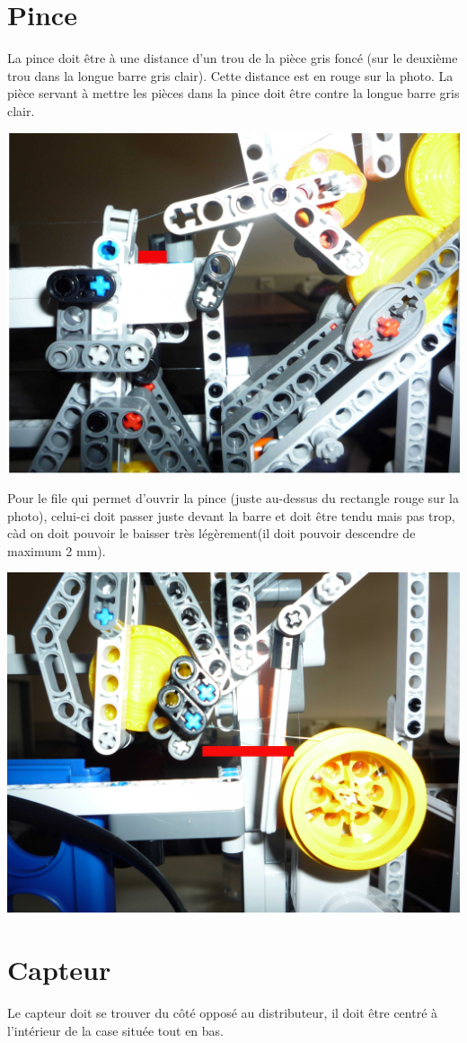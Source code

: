 \documentclass[12pt]{report}
\begin{document}
\section{Pince}
La pince doit être à une distance d'un trou de la pièce gris foncé 
(sur le deuxième trou dans la longue barre gris clair). Cette 
distance est en rouge sur la photo. La pièce servant à mettre les 
pièces dans la pince doit être contre la longue barre gris clair.
\begin{center}
		\includegraphics[width=0.7\linewidth]{images/posInitPince.JPG}
\end{center}


Pour le file qui permet d'ouvrir la pince (juste au-dessus du rectangle
rouge sur la photo), celui-ci doit passer juste devant la barre et doit
être tendu mais pas trop, càd on doit pouvoir le baisser très 
légèrement(il doit pouvoir descendre de maximum 2 mm).

\begin{center}
		\includegraphics[width=0.7\linewidth]{images/InitFilePince.JPG}
\end{center}

\section{Capteur}
Le capteur doit se trouver du côté opposé au distributeur, il doit être
centré à l'intérieur de la case située tout en bas.
\end{document}
